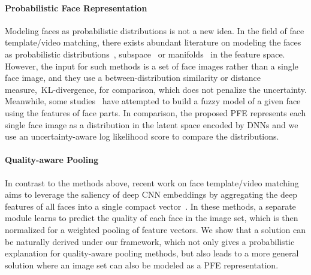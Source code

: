 \documentclass[10pt,twocolumn,letterpaper]{article}
\begin{document}
\vspace{-0.8em}\paragraph{Probabilistic Face Representation}
Modeling faces as probabilistic distributions is not a new idea. In the field of face template/video matching, there exists abundant literature on modeling the faces as probabilistic distributions~\cite{shakhnarovich2002face,arandjelovic2005face}, subspace~\cite{cevikalp2010face} or manifolds~\cite{arandjelovic2005face,huang2015log} in the feature space. However, the input for such methods is a set of face images rather than a single face image, and they use a between-distribution similarity or distance measure,~\eg KL-divergence, for comparison, which does not penalize the uncertainty. Meanwhile, some studies~\cite{li2013probabilistic,hiremath2007modelling} have attempted to build a fuzzy model of a given face using the features of face parts. In comparison, the proposed PFE represents each single face image as a distribution in the latent space encoded by DNNs and we use an uncertainty-aware log likelihood score to compare the distributions.


\vspace{-0.8em}\paragraph{Quality-aware Pooling}
In contrast to the methods above, recent work on face template/video matching aims to leverage the saliency of deep CNN embeddings by aggregating the deep features of all faces into a single compact vector~\cite{yang2017neural,liu2017quality,xie2018multicolumn,gong2019video}. In these methods, a separate module learns to predict the quality of each face in the image set, which is then normalized for a weighted pooling of feature vectors. We show that a solution can be naturally derived under our framework, which not only gives a probabilistic explanation for quality-aware pooling methods, but also leads to a more general solution where an image set can also be modeled as a PFE representation.
\end{document}
